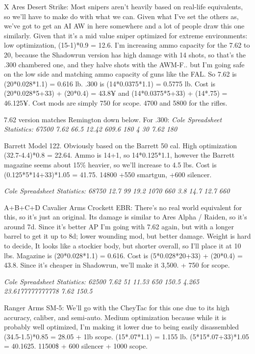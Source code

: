 \begin{multicols*}{2}
	X Ares Desert Strike: Most snipers aren't heavily based on real-life equivalents, so we'll have to make do with what we can. Given what I've set the others as, we've got to get an AI AW in here somewhere and a lot of people draw this one similarly. Given that it's a mid value sniper optimized for extreme environments: low optimization, (15-1)*0.9 = 12.6. I'm increasing ammo capacity for the 7.62 to 20, because the Shadowrun version has high damage with 14 shots, so that's the .300 chambered one, and they halve shots with the AWM-F.. but I'm going safe on the low side and matching ammo capacity of guns like the FAL. So 7.62 is (20*0.028*1.1) = 0.616 lb. .300 is (14*0.0375*1.1) = 0.5775 lb. Cost is (20*0.028*5+33) + (20*0.4) = 43.8¥ and (14*0.0375*5+33) + (14*.75) = 46.125¥. Cost mods are simply 750 for scope. 4700 and 5800 for the rifles.
	
	7.62 version matches Remington down below.
	For .300:
	\textit{\textcolor{OliveGreen}{Cole Spreadsheet Statistics: 67500 7.62 66.5 12.42 609.6 180 4 30 7.62 180}}
	
	Barrett Model 122. Obviously based on the Barrett 50 cal. High optimization (32.7-4.4)*0.8 = 22.64. Ammo is  14+1, so  14*0.125*1.1, however the Barrett magazine seems about 15\% heavier, so we'll increase to 4.5 lbs. Cost is (0.125*5*14+33)*1.05 = 41.75. 14800 +550 smartgun, +600 silencer.
	
	\textit{\textcolor{OliveGreen}{Cole Spreadsheet Statistics: 68750 12.7 99 19.2 1070 660 3.8 14.7 12.7 660}}
	
	A+B+C+D
	Cavalier Arms Crockett EBR: There's no real world equivalent for this, so it's just an original. Its damage is similar to Ares Alpha / Raiden, so it's around 7d. Since it's better AP I'm going with 7.62 again, but with a longer barrel to get it up to 8d; lower wounding mod, but better damage. Weight is hard to decide,  It looks like a stockier body, but shorter overall, so I'll place it at 10 lbs. Magazine is (20*0.028*1.1) = 0.616. Cost is (5*0.028*20+33) + (20*0.4) = 43.8. Since it's cheaper in Shadowrun, we'll make it 3,500. + 750 for scope.
	
	\textit{\textcolor{OliveGreen}{Cole Spreadsheet Statistics: 62500 7.62 51 11.53 650 150.5 4.265 23.6177777777778 7.62 150.5}}
	
	Ranger Arms SM-5: We'll go with the CheyTac for this one due to its high accuracy, caliber, and semi-auto. Medium optimization because while it is probably well optimized, I'm making it lower due to being easily disassembled (34.5-1.5)*0.85 = 28.05 + 1lb scope. (15*.07*1.1)  = 1.155 lb. (5*15*.07+33)*1.05 = 40.1625. 11500\$ + 600 silencer +  1000 scope.
	

\end{multicols*}
